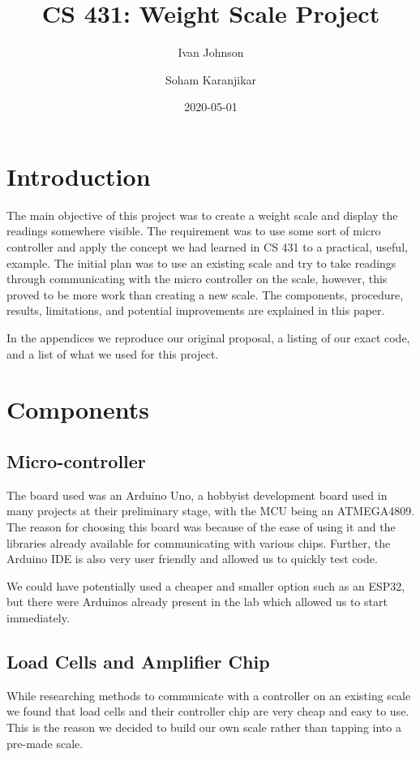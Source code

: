 \documentclass[letterpaper,11pt]{article}
\title{CS 431: Weight Scale Project}
\author{Ivan Johnson \and Soham Karanjikar}
\date{2020-05-01}
\begin{document}
\maketitle

\newpage
\section{Introduction}
The main objective of this project was to create a weight scale and display the
readings somewhere visible. The requirement was to use some sort of micro
controller and apply the concept we had learned in CS 431 to a practical,
useful, example. The initial plan was to use an existing scale and try to take
readings through communicating with the micro controller on the scale, however,
this proved to be more work than creating a new scale. The components,
procedure, results, limitations, and potential improvements are explained in
this paper.

In the appendices we reproduce our original proposal, a listing of our exact
code, and a list of what we used for this project.

\section{Components}
\subsection{Micro-controller}
The board used was an Arduino Uno, a hobbyist development board used in many
projects at their preliminary stage, with the MCU being an ATMEGA4809. The
reason for choosing this board was because of the ease of using it and the
libraries already available for communicating with various chips. Further, the
Arduino IDE is also very user friendly and allowed us to quickly test code.

We could have potentially used a cheaper and smaller option such as an ESP32,
but there were Arduinos already present in the lab which allowed us to start
immediately.

\subsection{Load Cells and Amplifier Chip}
While researching methods to communicate with a controller on an existing scale
we found that load cells and their controller chip are very cheap and easy to
use. This is the reason we decided to build our own scale rather than tapping
into a pre-made scale.
\end{document}
